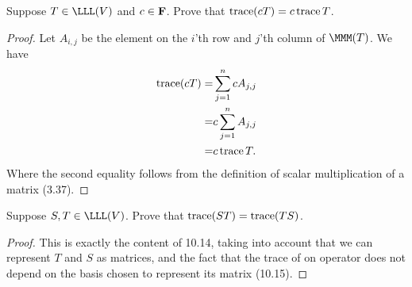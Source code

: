 \begin{exercise}{14}
  Suppose $T\in\LLL(V)$ and $c\in\mathbf{F}$. Prove that $\operatorname*{trace}(cT)=c\operatorname*{trace} T$.
\end{exercise}
\begin{proof}
 Let $A_{i,j}$ be the element on the $i$'th row and $j$'th column of $\MMM(T)$. We have 
 \begin{align*}
     \operatorname*{trace}(cT) =& \sum_{j=1}^ncA_{j,j}\\
     =& c\sum_{j=1}^nA_{j,j}\\
     =& c\operatorname*{trace} T.
 \end{align*}
 Where the second equality follows from the definition of scalar multiplication of a matrix (3.37).
\end{proof}

\begin{exercise}{15}
  Suppose $S,T\in\LLL(V)$. Prove that $\operatorname*{trace}(ST)=\operatorname*{trace}(TS)$.
\end{exercise}
\begin{proof}
 This is exactly the content of 10.14, taking into account that we can represent $T$ and $S$ as matrices, and the fact that the trace of on operator does not depend on the basis chosen to represent its matrix (10.15).
\end{proof}

